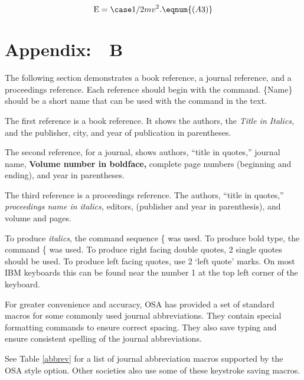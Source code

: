 \begin{equation} {\rm E} = \case 1/2 mv^2. \label{appa}
\eqnum{(A3)}\end{equation}

\section*{Appendix: $\,\,$ B}
The following section demonstrates a book reference, a journal reference,
and a proceedings reference.  Each reference should begin with the
  command.  \{Name\} should be a short name that
can be used with the  command in the text.

The first reference is a book reference. It shows the authors, the
{\it Title in Italics,} and the publisher, city, and year of publication
in parentheses.

The  second reference, for a journal, shows authors, ``title in quotes,''
journal name, {\bf Volume number in boldface,} complete page numbers
(beginning and ending), and year in parentheses.

The third reference is a proceedings reference.  The authors, ``title
in quotes,''  {\it proceedings name in italics,}
editors, (publisher and year in parenthesis), and volume and pages.

To produce {\it italics}, the command sequence
\{ was used.  To produce bold type, the
command \{ was used.  To produce right
facing double quotes, 2 single quotes should be used.  To produce
left facing quotes, use 2 `left quote' marks.  On most IBM keyboards
this can be found near the number 1 at the top left corner of the
keyboard.

For greater convenience and accuracy, OSA has provided a set of standard
macros for some commonly used journal abbreviations.  They contain
special formatting commands to ensure correct spacing.  They also
save typing and ensure consistent spelling of the journal abbreviations.

See Table \ref{abbrev} for a list of journal abbreviation macros
supported by the OSA style option.  Other societies also use some
of these keystroke saving macros.

